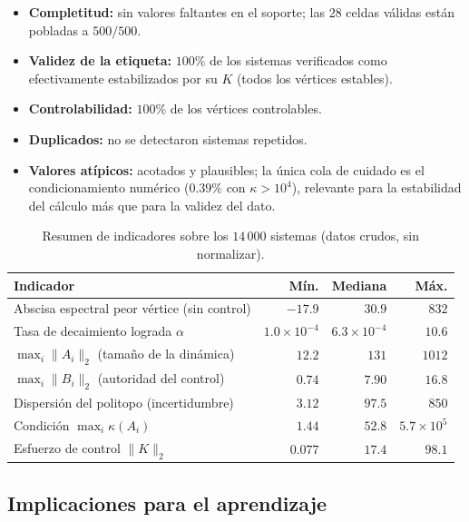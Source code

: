 \begin{itemize}
  \item \textbf{Completitud:} sin valores faltantes en el soporte; las $28$
        celdas válidas están pobladas a $500/500$.
  \item \textbf{Validez de la etiqueta:} $100\%$ de los sistemas verificados como
        efectivamente estabilizados por su $K$ (todos los vértices estables).
  \item \textbf{Controlabilidad:} $100\%$ de los vértices controlables.
  \item \textbf{Duplicados:} no se detectaron sistemas repetidos.
  \item \textbf{Valores atípicos:} acotados y plausibles; la única cola de
        cuidado es el condicionamiento numérico ($0.39\%$ con $\kappa>10^4$),
        relevante para la estabilidad del cálculo más que para la validez del dato.
\end{itemize}

\begin{table}[t]
  \centering
  \caption{Resumen de indicadores sobre los $14\,000$ sistemas (datos crudos,
  sin normalizar).}
  \label{tab:resumen}
  \begin{tabular}{lrrr}
    \toprule
    Indicador & Mín. & Mediana & Máx. \\
    \midrule
    Abscisa espectral peor vértice (sin control) & $-17.9$ & $30.9$ & $832$ \\
    Tasa de decaimiento lograda $\alpha$         & $1.0\times10^{-4}$ & $6.3\times10^{-4}$ & $10.6$ \\
    $\max_i\lVert A_i\rVert_2$ (tamaño de la dinámica) & $12.2$ & $131$ & $1012$ \\
    $\max_i\lVert B_i\rVert_2$ (autoridad del control) & $0.74$ & $7.90$ & $16.8$ \\
    Dispersión del politopo (incertidumbre)      & $3.12$ & $97.5$ & $850$ \\
    Condición $\max_i\kappa(A_i)$                 & $1.44$ & $52.8$ & $5.7\times10^{5}$ \\
    Esfuerzo de control $\lVert K\rVert_2$        & $0.077$ & $17.4$ & $98.1$ \\
    \bottomrule
  \end{tabular}
\end{table}

\subsection{Implicaciones para el aprendizaje}

